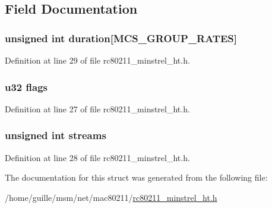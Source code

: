 \subsection{Field Documentation}
\hypertarget{structmcs__group_a7a838228e55c3ac5d8d5395b20cf6a59}{
\subsubsection[{duration}]{\setlength{\rightskip}{0pt plus 5cm}unsigned int duration\mbox{[}{\bf M\-C\-S\-\_\-\-G\-R\-O\-U\-P\-\_\-\-R\-A\-T\-E\-S}\mbox{]}}}\label{structmcs__group_a7a838228e55c3ac5d8d5395b20cf6a59}


Definition at line 29 of file rc80211\-\_\-minstrel\-\_\-ht.\-h.

\hypertarget{structmcs__group_a9fb2abd9f2594cefc48d6856e01f2879}{
\subsubsection[{flags}]{\setlength{\rightskip}{0pt plus 5cm}u32 flags}}\label{structmcs__group_a9fb2abd9f2594cefc48d6856e01f2879}


Definition at line 27 of file rc80211\-\_\-minstrel\-\_\-ht.\-h.

\hypertarget{structmcs__group_af400861305cbf09d0a43140c4da1e152}{
\subsubsection[{streams}]{\setlength{\rightskip}{0pt plus 5cm}unsigned int streams}}\label{structmcs__group_af400861305cbf09d0a43140c4da1e152}


Definition at line 28 of file rc80211\-\_\-minstrel\-\_\-ht.\-h.



The documentation for this struct was generated from the following file\-:\begin{DoxyCompactItemize}
\item 
/home/guille/msm/net/mac80211/\hyperlink{rc80211__minstrel__ht_8h}{rc80211\-\_\-minstrel\-\_\-ht.\-h}\end{DoxyCompactItemize}

